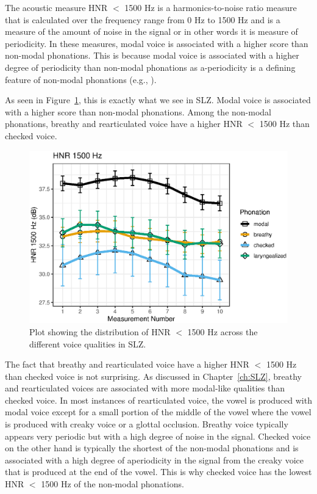 The acoustic measure HNR $<$ 1500 Hz is a harmonics-to-noise ratio measure that is calculated over the frequency range from 0 Hz to 1500 Hz and is a measure of the amount of noise in the signal or in other words it is measure of periodicity. In these measures, modal voice is associated with a higher score than non-modal phonations. This is because modal voice is associated with a higher degree of periodicity than non-modal phonations as a-periodicity is a defining feature of non-modal phonations (e.g., \cite{hillenbrandAcousticCorrelatesBreathy1996,blankenshipTimeCourseBreathiness1997,kentVoiceQualityMeasurement1999}).

As seen in Figure~\ref{fig:hnr1500}, this is exactly what we see in SLZ. Modal voice is associated with a higher score than non-modal phonations. Among the non-modal phonations, breathy and rearticulated voice have a higher HNR $<$ 1500 Hz than checked voice. 

\begin{figure}[h!]
    \centering
    \includegraphics[width = 0.9\linewidth]{images/slz_hnr15.eps}
    \caption{Plot showing the distribution of HNR $<$ 1500 Hz across the different voice qualities in SLZ.}
    \label{fig:hnr1500}
\end{figure}

The fact that breathy and rearticulated voice have a higher HNR $<$ 1500 Hz than checked voice is not surprising. As discussed in Chapter~\ref{ch:SLZ}, breathy and rearticulated voices are associated with more modal-like qualities than checked voice. In most instances of rearticulated voice, the vowel is produced with modal voice except for a small portion of the middle of the vowel where the vowel is produced with creaky voice or a glottal occlusion. Breathy voice typically appears  very periodic but with a high degree of noise in the signal. Checked voice on the other hand is typically the shortest of the non-modal phonations and is associated with a high degree of aperiodicity in the signal from the creaky voice that is produced at the end of the vowel. This is why checked voice has the lowest HNR $<$ 1500 Hz of the non-modal phonations.

